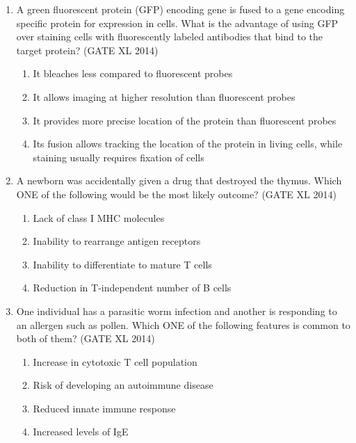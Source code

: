 \documentclass[journal,12pt,onecolumn]{IEEEtran}
\theoremstyle{remark}
\begin{document}
\begin{enumerate}
\item A green fluorescent protein (GFP) encoding gene is fused to a gene encoding specific protein for expression in cells. What is the advantage of using GFP over staining cells with fluorescently labeled antibodies that bind to the target protein? \hfill(GATE XL 2014)\\
\begin{enumerate}
\item It bleaches less compared to fluorescent probes
\item It allows imaging at higher resolution than fluorescent probes
\item It provides more precise location of the protein than fluorescent probes
\item Its fusion allows tracking the location of the protein in living cells, while staining usually requires fixation of cells
\end{enumerate}

\item A newborn was accidentally given a drug that destroyed the thymus. Which ONE of the following would be the most likely outcome? \hfill(GATE XL 2014)\\
\begin{multicols}{2}
\begin{enumerate}
\item Lack of class I MHC molecules
\item Inability to rearrange antigen receptors
\item Inability to differentiate to mature T cells
\item Reduction in T-independent number of B cells
\end{enumerate}
\end{multicols}

\item One individual has a parasitic worm infection and another is responding to an allergen such as pollen. Which ONE of the following features is common to both of them? \hfill(GATE XL 2014)\\
\begin{multicols}{2}
\begin{enumerate}
\item Increase in cytotoxic T cell population
\item Risk of developing an autoimmune disease
\item Reduced innate immune response
\item Increased levels of IgE
\end{enumerate}
\end{multicols}


\end{enumerate}
\end{document}
